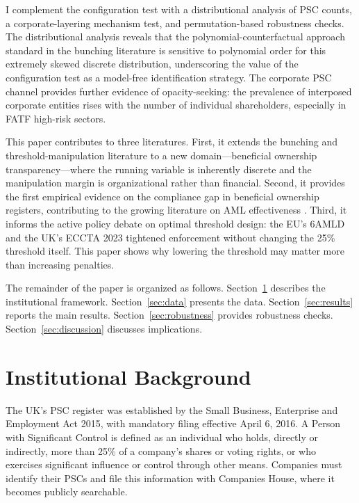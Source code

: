 \documentclass[12pt]{article}
\begin{document}
I complement the configuration test with a distributional analysis of PSC counts, a corporate-layering mechanism test, and permutation-based robustness checks. The distributional analysis reveals that the polynomial-counterfactual approach standard in the bunching literature \citep{chetty2011adjustment, kleven2013using} is sensitive to polynomial order for this extremely skewed discrete distribution, underscoring the value of the configuration test as a model-free identification strategy. The corporate PSC channel provides further evidence of opacity-seeking: the prevalence of interposed corporate entities rises with the number of individual shareholders, especially in FATF high-risk sectors.

This paper contributes to three literatures. First, it extends the bunching and threshold-manipulation literature \citep{saez2010taxpayers, kleven2013using, dharmapala2023sarbanes} to a new domain---beneficial ownership transparency---where the running variable is inherently discrete and the manipulation margin is organizational rather than financial. Second, it provides the first empirical evidence on the compliance gap in beneficial ownership registers, contributing to the growing literature on AML effectiveness \citep{findley2015global, johannesen2020elite, londono2022beneficial}. Third, it informs the active policy debate on optimal threshold design: the EU's 6AMLD and the UK's ECCTA 2023 tightened enforcement without changing the 25\% threshold itself. This paper shows why lowering the threshold may matter more than increasing penalties.

The remainder of the paper is organized as follows. Section~\ref{sec:background} describes the institutional framework. Section~\ref{sec:data} presents the data. Section~\ref{sec:results} reports the main results. Section~\ref{sec:robustness} provides robustness checks. Section~\ref{sec:discussion} discusses implications.


\section{Institutional Background}
\label{sec:background}

The UK's PSC register was established by the Small Business, Enterprise and Employment Act 2015, with mandatory filing effective April 6, 2016. A Person with Significant Control is defined as an individual who holds, directly or indirectly, more than 25\% of a company's shares or voting rights, or who exercises significant influence or control through other means. Companies must identify their PSCs and file this information with Companies House, where it becomes publicly searchable.
\end{document}
